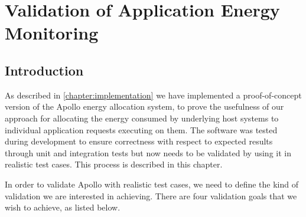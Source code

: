 \chapter{Validation of Application Energy Monitoring}
\label{chapter:validation}


\section{Introduction}

As described in \cref{chapter:implementation} we have implemented a proof-of-concept version of the Apollo energy allocation system, to prove the usefulness of our approach for allocating the energy consumed by underlying host systems to individual application requests executing on them.  The software was tested during development to ensure correctness with respect to expected results through unit and integration tests but now needs to be validated by using it in realistic test cases.  This process is described in this chapter.

In order to validate Apollo with realistic test cases, we need to define the kind of validation we are interested in achieving.  There are four validation goals that we wish to achieve, as listed below.

